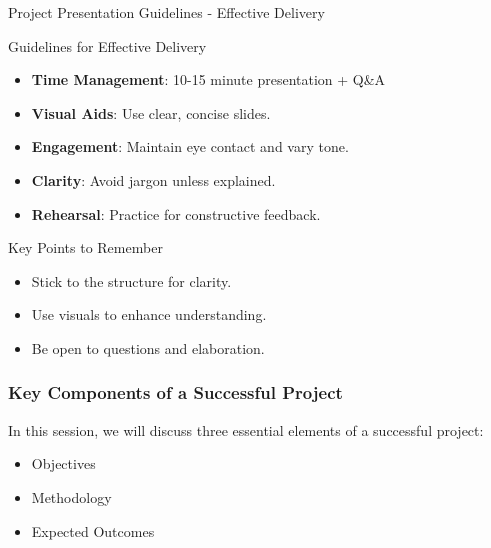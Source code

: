\documentclass[aspectratio=169]{beamer}
\begin{document}
\begin{frame}[fragile]{Project Presentation Guidelines - Effective Delivery}
    \begin{block}{Guidelines for Effective Delivery}
        \begin{itemize}
            \item \textbf{Time Management}: 10-15 minute presentation + Q\&A
            \item \textbf{Visual Aids}: Use clear, concise slides.
            \item \textbf{Engagement}: Maintain eye contact and vary tone.
            \item \textbf{Clarity}: Avoid jargon unless explained.
            \item \textbf{Rehearsal}: Practice for constructive feedback.
        \end{itemize}
    \end{block}

    \begin{block}{Key Points to Remember}
        \begin{itemize}
            \item Stick to the structure for clarity.
            \item Use visuals to enhance understanding.
            \item Be open to questions and elaboration.
        \end{itemize}
    \end{block}
\end{frame}

\begin{frame}[fragile]
    \frametitle{Key Components of a Successful Project}
    In this session, we will discuss three essential elements of a successful project:
    \begin{itemize}
        \item Objectives
        \item Methodology
        \item Expected Outcomes
    \end{itemize}
\end{frame}
\end{document}
